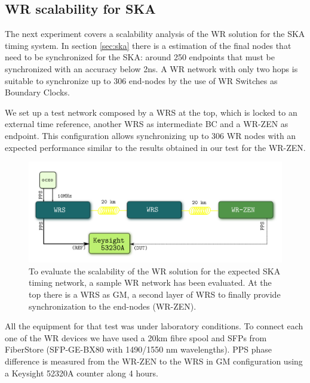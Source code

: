 \subsection{WR scalability for SKA}
\label{subsec: net_exp}

The next experiment covers a scalability analysis of the WR solution for the 
SKA timing system. In section \ref{sec:ska} there is a estimation of the final 
nodes that need to be synchronized for the SKA: around 250 endpoints that 
must be synchronized with an accuracy below 2ns. A WR network with only two 
hops is suitable to synchronize up to 306 end-nodes by the use of WR Switches as 
Boundary Clocks.

We set up a test network composed by a WRS at the top, which is locked to an 
external time reference, another WRS as intermediate BC and a WR-ZEN as 
endpoint. This configuration allows synchronizing up to 306 WR nodes with an 
expected performance similar to the results obtained in our test for the WR-ZEN.

\begin{figure}
	\centering
	\includegraphics[width=0.7\linewidth]{img/prueba_red}
	\caption[WR Scalability test's setup for SKA]{To evaluate the scalability 
	of the WR solution for the expected SKA timing network, a sample WR 
	network has been evaluated. At the top there is a WRS as GM, a second layer 
	of WRS to finally provide synchronization to the end-nodes (WR-ZEN).}
	\label{fig:pruebared}
\end{figure}


All the equipment for that test was under laboratory conditions. To connect 
each one of the WR devices we have used a 20km fibre spool and SFPs from 
FiberStore (SFP-GE-BX80 with 1490/1550 nm wavelengths). PPS phase difference is 
measured from the WR-ZEN to the WRS in GM configuration using a Keysight 52320A 
counter along 4 hours.

